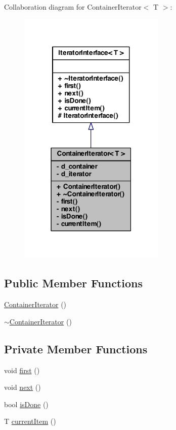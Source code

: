 Collaboration diagram for ContainerIterator$<$ T $>$:
\nopagebreak
\begin{figure}[H]
\begin{center}
\leavevmode
\includegraphics[width=198pt]{class_container_iterator__coll__graph}
\end{center}
\end{figure}
\subsection*{Public Member Functions}
\begin{DoxyCompactItemize}
\item 
\hyperlink{class_container_iterator_a5cc7e5a75c276e224706891547e3cf24}{ContainerIterator} ()
\item 
\hyperlink{class_container_iterator_a448896907e42b5676b9cccd0b59e0e43}{$\sim$ContainerIterator} ()
\end{DoxyCompactItemize}
\subsection*{Private Member Functions}
\begin{DoxyCompactItemize}
\item 
void \hyperlink{class_container_iterator_a98924935aa2d0b5f1d3bdbb8b3bc0a69}{first} ()
\item 
void \hyperlink{class_container_iterator_ae9996be7cbe4ada65c214372da509049}{next} ()
\item 
bool \hyperlink{class_container_iterator_a533dcd7d4c59663c0ae99f67f4b5e9c6}{isDone} ()
\item 
T \hyperlink{class_container_iterator_a088e991e5eade5740290342a49d71467}{currentItem} ()
\end{DoxyCompactItemize}
